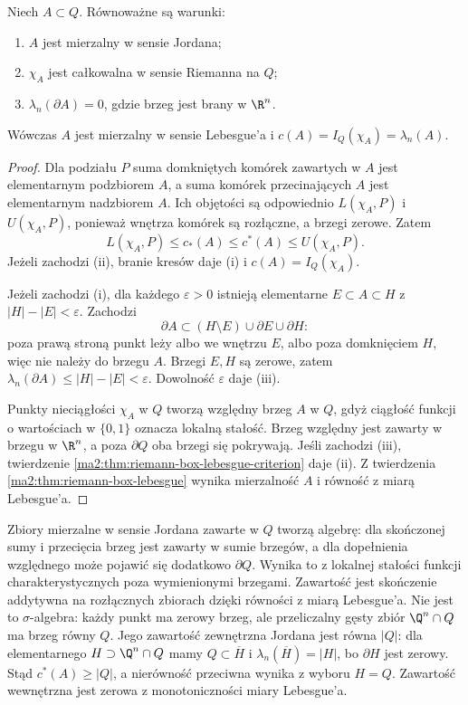 \begin{twierdzenie}
\label{ma2:thm:jordan-criterion}
Niech $A\subset Q$. Równoważne są warunki:
\begin{enumerate}[label=(\roman*)]
\item $A$ jest mierzalny w sensie Jordana;
\item $\chi_A$ jest całkowalna w sensie Riemanna na $Q$;
\item $\lambda_n(\partial A)=0$, gdzie brzeg jest
brany w $\R^n$.
\end{enumerate}
Wówczas $A$ jest mierzalny w sensie Lebesgue'a i
$c(A)=I_Q(\chi_A)=\lambda_n(A)$.
\end{twierdzenie}
\begin{proof}
Dla podziału $P$ suma domkniętych komórek
zawartych w $A$ jest elementarnym podzbiorem $A$,
a suma komórek przecinających $A$ jest elementarnym
nadzbiorem $A$. Ich objętości są odpowiednio
$L(\chi_A,P)$ i $U(\chi_A,P)$, ponieważ wnętrza
komórek są rozłączne, a brzegi zerowe. Zatem
\[
 L(\chi_A,P)\le c_*(A)\le c^*(A)\le U(\chi_A,P).
\]
Jeżeli zachodzi (ii), branie kresów daje (i)
i $c(A)=I_Q(\chi_A)$.

Jeżeli zachodzi (i), dla każdego $\varepsilon>0$
istnieją elementarne $E\subset A\subset H$ z
$|H|-|E|<\varepsilon$. Zachodzi
\[
 \partial A\subset (H\setminus E)\cup\partial E\cup\partial H:
\]
poza prawą stroną punkt leży albo we wnętrzu $E$,
albo poza domknięciem $H$, więc nie należy do
brzegu $A$. Brzegi $E,H$ są zerowe, zatem
$\lambda_n(\partial A)\le |H|-|E|<\varepsilon$.
Dowolność $\varepsilon$ daje (iii).

Punkty nieciągłości $\chi_A$ w $Q$ tworzą względny
brzeg $A$ w $Q$, gdyż ciągłość funkcji o wartościach
w $\{0,1\}$ oznacza lokalną stałość. Brzeg względny
jest zawarty w brzegu w $\R^n$, a poza $\partial Q$
oba brzegi się pokrywają. Jeśli zachodzi (iii),
twierdzenie \ref{ma2:thm:riemann-box-lebesgue-criterion}
daje (ii). Z twierdzenia
\ref{ma2:thm:riemann-box-lebesgue} wynika mierzalność
$A$ i równość z miarą Lebesgue'a.
\end{proof}

Zbiory mierzalne w sensie Jordana zawarte w $Q$
tworzą algebrę: dla skończonej sumy i przecięcia
brzeg jest zawarty w sumie brzegów, a dla dopełnienia
względnego może pojawić się dodatkowo $\partial Q$.
Wynika to z lokalnej stałości funkcji charakterystycznych
poza wymienionymi brzegami. Zawartość jest skończenie
addytywna na rozłącznych zbiorach dzięki równości
z miarą Lebesgue'a. Nie jest to $\sigma$-algebra:
każdy punkt ma zerowy brzeg, ale przeliczalny gęsty
zbiór $\Q^n\cap Q$ ma brzeg równy $Q$.
Jego zawartość zewnętrzna Jordana jest równa $|Q|$:
dla elementarnego $H\supset\Q^n\cap Q$ mamy
$Q\subset\overline H$ i $\lambda_n(\overline H)=|H|$,
bo $\partial H$ jest zerowy. Stąd $c^*(A)\ge|Q|$,
a nierówność przeciwna wynika z wyboru $H=Q$.
Zawartość wewnętrzna jest zerowa z monotoniczności
miary Lebesgue'a.

